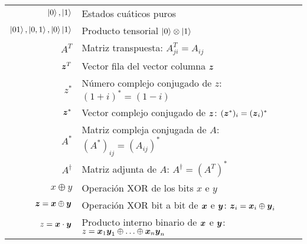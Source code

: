 \begin{table}[h]
\begin{tabular}{rl}
		$\ket0, \ket1$
		&Estados cuáticos puros\\

		$\ket{01}, \ket{0,1}, \ket0 \ket1$
		&Producto tensorial $\ket0 \otimes\ket1$\\

		$A^T$
		&Matriz transpuesta: $A^T_{ji} = A_{ij}$\\

		$\boldsymbol{z}^T$
		&Vector fila del vector columna $\boldsymbol{z}$\\

		$z^*$
		&Número complejo conjugado de $z$: $(1+i)^* = (1-i)$\\

		$\boldsymbol{z}^*$
		&Vector complejo conjugado de $\boldsymbol{z}$: $(\boldsymbol{z}^*)_i =
		(\boldsymbol{z}_i)^*$\\

		$A^*$
		&Matriz compleja conjugada de $A$: $(A^*)_{ij} =
		(A_{ij})^*$\\

		$A^\dagger$
		&Matriz adjunta de $A$: $A^\dagger = (A^T)^*$\\

		$x \oplus y$
		&Operación XOR de los bits $x$ e $y$\\

		$\boldsymbol{z} = \boldsymbol{x} \oplus \boldsymbol{y}$
		&Operación XOR bit a bit de $\boldsymbol{x}$ e $\boldsymbol{y}$:
		$\boldsymbol{z}_i = \boldsymbol{x}_i \oplus \boldsymbol{y}_i$\\

		$z = \boldsymbol{x} \cdot \boldsymbol{y}$
		&Producto interno binario de $\boldsymbol{x}$ e $\boldsymbol{y}$:
		$z = \boldsymbol{x}_1 \boldsymbol{y}_1 \oplus \ldots \oplus \boldsymbol{x}_n \boldsymbol{y}_n$\\
		\bottomrule
	\end{tabular}
\end{table}


